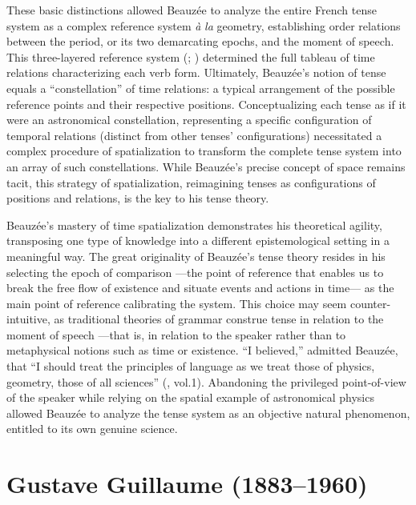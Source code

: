 \documentclass[output=paper]{langsci/langscibook}
\begin{document}
 These basic distinctions allowed Beauzée to analyze the entire French tense system as a complex reference system \textit{à} \textit{la} geometry, establishing order relations between the period, or its two demarcating epochs, and the moment of speech. This three-layered reference system (\citealt{auroux_innovation_1991}; \citealt{fournier_histoire_2013}) determined the full tableau of time relations characterizing each verb form. Ultimately, Beauzée’s notion of tense equals a “constellation” of time relations: a typical arrangement of the possible reference points and their respective positions. Conceptualizing each tense as if it were an astronomical constellation, representing a specific configuration of temporal relations (distinct from other tenses’ configurations) necessitated a complex procedure of spatialization to transform the complete tense system into an array of such constellations. While Beauzée’s precise concept of space remains tacit, this strategy of spatialization, reimagining tenses as configurations of positions and relations, is the key to his tense theory.

Beauzée’s mastery of time spatialization demonstrates his theoretical agility, transposing one type of knowledge into a different epistemological setting in a meaningful way. The great originality of Beauzée’s tense theory resides in his selecting the epoch of comparison —the point of reference that enables us to break the free flow of existence and situate events and actions in time— as the main point of reference calibrating the system. This choice may seem counter-intuitive, as traditional theories of grammar construe tense in relation to the moment of speech —that is, in relation to the speaker rather than to metaphysical notions such as time or existence. “I believed,” admitted Beauzée, that “I should treat the principles of language as we treat those of physics, geometry, those of all sciences” (\citeyear[xvi]{beauzee_grammaire_1767}, vol.1). Abandoning the privileged point\nobreakdash-of\nobreakdash-view of the speaker while relying on the spatial example of astronomical physics allowed Beauzée to analyze the tense system as an objective natural phenomenon, entitled to its own genuine science.

\section{Gustave Guillaume (1883–1960)}
\end{document}
